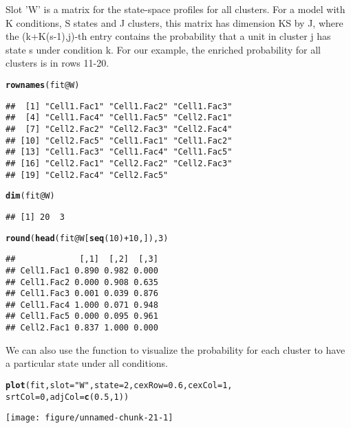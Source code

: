 \documentclass[a4paper,10pt]{article}\usepackage[]{graphicx}\usepackage[]{color}
\makeatletter
\def\maxwidth{ %
  \ifdim\Gin@nat@width>\linewidth
    \linewidth
  \else
    \Gin@nat@width
  \fi
}
\newcommand{\hlnum}[1]{\textcolor[rgb]{0.686,0.059,0.569}{#1}}%
\newcommand{\hlstr}[1]{\textcolor[rgb]{0.192,0.494,0.8}{#1}}%
\newcommand{\hlopt}[1]{\textcolor[rgb]{0,0,0}{#1}}%
\newcommand{\hlstd}[1]{\textcolor[rgb]{0.345,0.345,0.345}{#1}}%
\newcommand{\hlkwc}[1]{\textcolor[rgb]{0.333,0.667,0.333}{#1}}%
\newcommand{\hlkwd}[1]{\textcolor[rgb]{0.737,0.353,0.396}{\textbf{#1}}}%
\newenvironment{kframe}{%
 \def\at@end@of@kframe{}%
 \ifinner\ifhmode%
  \def\at@end@of@kframe{\end{minipage}}%
  \begin{minipage}{\columnwidth}%
 \fi\fi%
 \def\FrameCommand##1{\hskip\@totalleftmargin \hskip-\fboxsep
 \colorbox{shadecolor}{##1}\hskip-\fboxsep
     \hskip-\linewidth \hskip-\@totalleftmargin \hskip\columnwidth}%
 \MakeFramed {\advance\hsize-\width
   \@totalleftmargin\z@ \linewidth\hsize
   \@setminipage}}%
 {\par\unskip\endMakeFramed%
 \at@end@of@kframe}
\newenvironment{knitrout}{}{} %
\makeatother
\begin{document}
Slot 'W' is a matrix for the state-space profiles for all clusters. For a model with K conditions, S states and J clusters, this matrix has dimension KS by J, where the (k+K(s-1),j)-th entry contains the probability that a unit in cluster j has state s under condition k. For our example, the enriched probability for all clusters is in rows 11-20.

\begin{knitrout}
\color{fgcolor}\begin{kframe}
\begin{alltt}
\hlkwd{rownames}\hlstd{(fit}\hlopt{@}\hlkwc{W}\hlstd{)}
\end{alltt}
\begin{verbatim}
##  [1] "Cell1.Fac1" "Cell1.Fac2" "Cell1.Fac3"
##  [4] "Cell1.Fac4" "Cell1.Fac5" "Cell2.Fac1"
##  [7] "Cell2.Fac2" "Cell2.Fac3" "Cell2.Fac4"
## [10] "Cell2.Fac5" "Cell1.Fac1" "Cell1.Fac2"
## [13] "Cell1.Fac3" "Cell1.Fac4" "Cell1.Fac5"
## [16] "Cell2.Fac1" "Cell2.Fac2" "Cell2.Fac3"
## [19] "Cell2.Fac4" "Cell2.Fac5"
\end{verbatim}
\begin{alltt}
\hlkwd{dim}\hlstd{(fit}\hlopt{@}\hlkwc{W}\hlstd{)}
\end{alltt}
\begin{verbatim}
## [1] 20  3
\end{verbatim}
\begin{alltt}
\hlkwd{round}\hlstd{(}\hlkwd{head}\hlstd{(fit}\hlopt{@}\hlkwc{W}\hlstd{[}\hlkwd{seq}\hlstd{(}\hlnum{10}\hlstd{)} \hlopt{+} \hlnum{10}\hlstd{, ]),} \hlnum{3}\hlstd{)}
\end{alltt}
\begin{verbatim}
##             [,1]  [,2]  [,3]
## Cell1.Fac1 0.890 0.982 0.000
## Cell1.Fac2 0.000 0.908 0.635
## Cell1.Fac3 0.001 0.039 0.876
## Cell1.Fac4 1.000 0.071 0.948
## Cell1.Fac5 0.000 0.095 0.961
## Cell2.Fac1 0.837 1.000 0.000
\end{verbatim}
\end{kframe}
\end{knitrout}

We can also use the  function to visualize the probability for each cluster to have a particular state under all conditions.

\begin{knitrout}
\color{fgcolor}\begin{kframe}
\begin{alltt}
\hlkwd{plot}\hlstd{(fit,} \hlkwc{slot} \hlstd{=} \hlstr{"W"}\hlstd{,} \hlkwc{state} \hlstd{=} \hlnum{2}\hlstd{,} \hlkwc{cexRow} \hlstd{=} \hlnum{0.6}\hlstd{,} \hlkwc{cexCol} \hlstd{=} \hlnum{1}\hlstd{,}
    \hlkwc{srtCol} \hlstd{=} \hlnum{0}\hlstd{,} \hlkwc{adjCol} \hlstd{=} \hlkwd{c}\hlstd{(}\hlnum{0.5}\hlstd{,} \hlnum{1}\hlstd{))}
\end{alltt}
\end{kframe}

{\centering \texttt{[image: figure/unnamed-chunk-21-1]} 

}



\end{knitrout}
\end{document}
